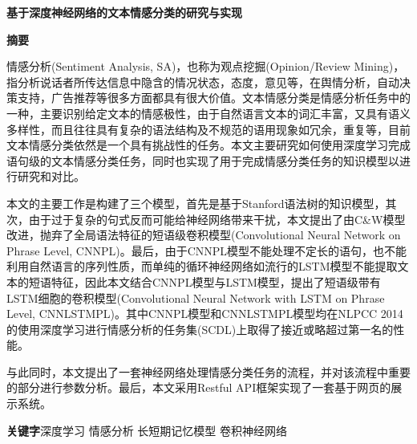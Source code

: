 \newpage
\begin{center}
	\heiti{}\textbf{基于深度神经网络的文本情感分类的研究与实现} 
\end{center} 
\begin{center}
	\heiti{}\textbf{摘\quad 要}
\end{center} 
\vspace{2.5mm}
\songti{}  

情感分析(Sentiment Analysis, SA)，也称为观点挖掘(Opinion/Review Mining)，指分析说话者所传达信息中隐含的情况状态，态度，意见等，在舆情分析，自动决策支持，广告推荐等很多方面都具有很大价值。文本情感分类是情感分析任务中的一种，主要识别给定文本的情感极性，由于自然语言文本的词汇丰富，又具有语义多样性，而且往往具有复杂的语法结构及不规范的语用现象如冗余，重复等，目前文本情感分类依然是一个具有挑战性的任务。本文主要研究如何使用深度学习完成语句级的文本情感分类任务，同时也实现了用于完成情感分类任务的知识模型以进行研究和对比。


本文的主要工作是构建了三个模型，首先是基于Stanford语法树的知识模型，其次，由于过于复杂的句式反而可能给神经网络带来干扰，本文提出了由C\&W模型改进，抛弃了全局语法特征的短语级卷积模型(Convolutional Neural Network on Phrase Level, CNNPL)。最后，由于CNNPL模型不能处理不定长的语句，也不能利用自然语言的序列性质，而单纯的循环神经网络如流行的LSTM模型不能提取文本的短语特征，因此本文结合CNNPL模型与LSTM模型，提出了短语级带有LSTM细胞的卷积模型(Convolutional Neural Network with LSTM on Phrase Level, CNNLSTMPL)。其中CNNPL模型和CNNLSTMPL模型均在NLPCC 2014的使用深度学习进行情感分析的任务集(SCDL)上取得了接近或略超过第一名的性能。


与此同时，本文提出了一套神经网络处理情感分类任务的流程，并对该流程中重要的部分进行参数分析。最后，本文采用Restful API框架实现了一套基于网页的展示系统。

\vspace{3mm}
\heiti\textbf{关键字}\quad \songti 深度学习 \quad 情感分析 \quad 长短期记忆模型 \quad 卷积神经网络

